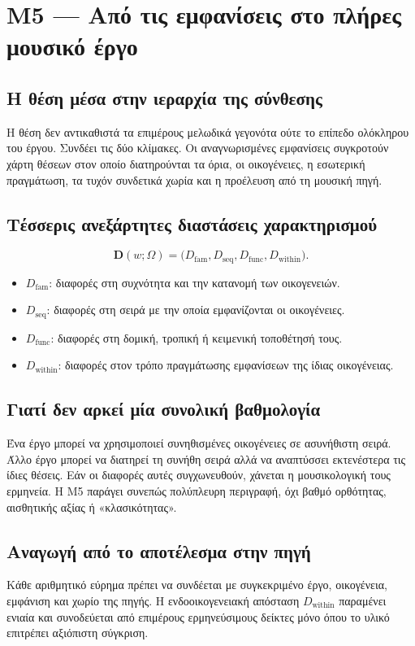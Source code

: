 \documentclass[11pt,a4paper]{extarticle}
\begin{document}
\section{M5 — Από τις εμφανίσεις στο πλήρες μουσικό έργο}
\subsection*{Η θέση μέσα στην ιεραρχία της σύνθεσης}
Η θέση δεν αντικαθιστά τα επιμέρους μελωδικά γεγονότα ούτε το επίπεδο ολόκληρου του έργου. Συνδέει τις δύο κλίμακες. Οι αναγνωρισμένες εμφανίσεις συγκροτούν χάρτη θέσεων στον οποίο διατηρούνται τα όρια, οι οικογένειες, η εσωτερική πραγμάτωση, τα τυχόν συνδετικά χωρία και η προέλευση από τη μουσική πηγή.

\subsection*{Τέσσερις ανεξάρτητες διαστάσεις χαρακτηρισμού}
\[
\mathbf D(w;\Omega)=\bigl(D_{\mathrm{fam}},D_{\mathrm{seq}},D_{\mathrm{func}},D_{\mathrm{within}}\bigr).
\]
\begin{itemize}
\item \(D_{\mathrm{fam}}\): διαφορές στη συχνότητα και την κατανομή των οικογενειών.
\item \(D_{\mathrm{seq}}\): διαφορές στη σειρά με την οποία εμφανίζονται οι οικογένειες.
\item \(D_{\mathrm{func}}\): διαφορές στη δομική, τροπική ή κειμενική τοποθέτησή τους.
\item \(D_{\mathrm{within}}\): διαφορές στον τρόπο πραγμάτωσης εμφανίσεων της ίδιας οικογένειας.
\end{itemize}

\subsection*{Γιατί δεν αρκεί μία συνολική βαθμολογία}
Ένα έργο μπορεί να χρησιμοποιεί συνηθισμένες οικογένειες σε ασυνήθιστη σειρά. Άλλο έργο μπορεί να διατηρεί τη συνήθη σειρά αλλά να αναπτύσσει εκτενέστερα τις ίδιες θέσεις. Εάν οι διαφορές αυτές συγχωνευθούν, χάνεται η μουσικολογική τους ερμηνεία. Η M5 παράγει συνεπώς πολύπλευρη περιγραφή, όχι βαθμό ορθότητας, αισθητικής αξίας ή «κλασικότητας».

\subsection*{Αναγωγή από το αποτέλεσμα στην πηγή}
Κάθε αριθμητικό εύρημα πρέπει να συνδέεται με συγκεκριμένο έργο, οικογένεια, εμφάνιση και χωρίο της πηγής. Η ενδοοικογενειακή απόσταση \(D_{\mathrm{within}}\) παραμένει ενιαία και συνοδεύεται από επιμέρους ερμηνεύσιμους δείκτες μόνο όπου το υλικό επιτρέπει αξιόπιστη σύγκριση.
\end{document}
